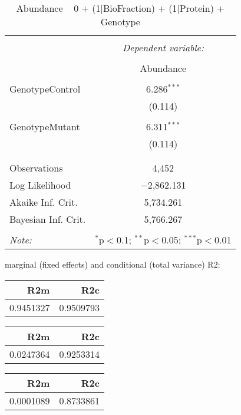 \documentclass[11pt]{report}
\begin{document}
\begin{table}[!htbp] \centering 
  \caption{Abundance ~ 0 + (1|BioFraction) + (1|Protein) + Genotype} 
  \label{} 
\begin{tabular}{@{\extracolsep{5pt}}lc} 
\\[-1.8ex]\hline 
\hline \\[-1.8ex] 
 & \multicolumn{1}{c}{\textit{Dependent variable:}} \\ 
\cline{2-2} 
\\[-1.8ex] & Abundance \\ 
\hline \\[-1.8ex] 
 GenotypeControl & 6.286$^{***}$ \\ 
  & (0.114) \\ 
  & \\ 
 GenotypeMutant & 6.311$^{***}$ \\ 
  & (0.114) \\ 
  & \\ 
\hline \\[-1.8ex] 
Observations & 4,452 \\ 
Log Likelihood & $-$2,862.131 \\ 
Akaike Inf. Crit. & 5,734.261 \\ 
Bayesian Inf. Crit. & 5,766.267 \\ 
\hline 
\hline \\[-1.8ex] 
\textit{Note:}  & \multicolumn{1}{r}{$^{*}$p$<$0.1; $^{**}$p$<$0.05; $^{***}$p$<$0.01} \\ 
\end{tabular} 
\end{table} 
marginal (fixed effects) and conditional (total variance) R2:

\begin{tabular}{r|r}
\hline
R2m & R2c\\
\hline
0.9451327 & 0.9509793\\
\hline
\end{tabular}

\begin{tabular}{r|r}
\hline
R2m & R2c\\
\hline
0.0247364 & 0.9253314\\
\hline
\end{tabular}

\begin{tabular}{r|r}
\hline
R2m & R2c\\
\hline
0.0001089 & 0.8733861\\
\hline
\end{tabular}
\end{document}

